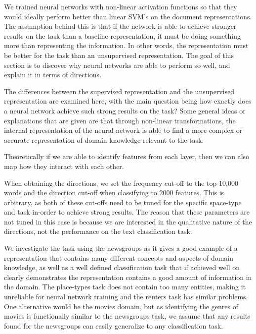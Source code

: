 We trained neural networks with non-linear activation functions so that they would ideally perform better than linear SVM's on the document representations. The assumption behind this is that if the network is able to achieve stronger results on the task than a baseline representation, it must be doing something more than representing the information. In other words, the representation must be better for the task than an unsupervised representation. The goal of this section is to discover why neural networks are able to perform so well, and explain it in terms of directions. 

The  differences between the supervised representation and the unsupervised representation are examined here, with the main question being how exactly does a neural network achieve such strong results on the task? Some general ideas or explanations that are given are that through non-linear transformations, the internal representation of the neural network is able to find a more complex or accurate representation of domain knowledge relevant to the task.  %

Theoretically if we are able to identify features from each layer, then we can also map how they interact with each other. 

When obtaining the directions, we set the frequency cut-off to the top 10,000 words and the direction cut-off when classifying to 2000 features. This is arbitrary, as both of these cut-offs need to be tuned for the specific space-type and task in-order to achieve strong results. The reason that these parameters are not tuned in this case is because we are interested in the qualitative nature of the directions, not the performance on the text classification task. 

We investigate the task using the newsgroups as it gives a good example of a representation that contains many different concepts and aspects of domain knowledge, as well as a well defined classification task that if achieved well on clearly demonstrates the representation contains a good amount of information in the domain. The place-types task does not contain too many entities, making it unreliable for neural network training and the reuters task has similar problems. One alternative would be the movies domain, but as identifying the genres of movies is functionally similar to the newsgroups task, we assume that any results found for the newsgroups can easily generalize to any classification task.

